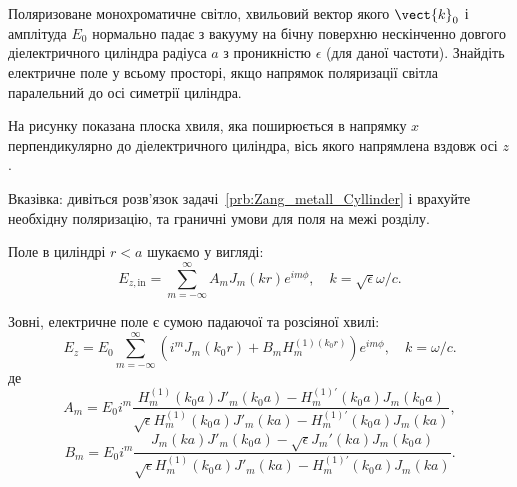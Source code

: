 \begin{problem}%
Поляризоване монохроматичне світло, хвильовий вектор якого $\vect{k}_0$  і амплітуда $E_0$ нормально
падає з вакууму на бічну поверхню нескінченно довгого діелектричного циліндра радіуса $a$ з
проникністю $\epsilon$ (для даної частоти). Знайдіть електричне поле у всьому просторі, якщо напрямок
поляризації світла паралельний до осі симетрії циліндра.
\begin{solution}
	На рисунку показана плоска хвиля, яка поширюється в напрямку $x$ перпендикулярно до діелектричного
	циліндра, вісь якого напрямлена вздовж осі $z$.

	\begin{center}
	\end{center}

	Вказівка: дивіться розв'язок задачі~\ref{prb:Zang_metall_Cyllinder} і врахуйте необхідну
	поляризацію, та граничні умови для поля на межі розділу.

	Поле в циліндрі $r < a$ шукаємо у вигляді:
	\[
		E_{z,\text{in}} = \sum\limits_{m = -\infty}^{\infty}A_mJ_m(kr)e^{im\phi}, \quad
		k=\sqrt{\epsilon} \omega/c.
	\]

	Зовні, електричне поле є сумою падаючої та розсіяної хвилі:
	\[
		E_z = E_0 \sum\limits_{m = -\infty}^{\infty} \left( i^m J_m(k_0 r) + B_m H_m^{(1)(k_0r)}
		\right) e^{im\phi}, \quad k= \omega/c.
	\]
	де
	\[
		A_m = E_0i^m \frac{  H_m^{(1)}(k_0a) J'_m(k_0a) - H_m^{(1)\prime}(k_0a) J_m(k_0a)    }{
		\sqrt{\epsilon} H_m^{(1)}(k_0a) J'_m(ka) - H_m^{(1)\prime}(k_0a) J_m(ka)},
	\]
	\[
		B_m = E_0i^m \frac{  J_m(ka) J'_m(k_0a) - \sqrt{\epsilon} J_m'(ka) J_m(k_0a)    }{
		\sqrt{\epsilon} H_m^{(1)}(k_0a) J'_m(ka) - H_m^{(1)\prime}(k_0a) J_m(ka)}.
	\]

\end{solution}
\end{problem}

